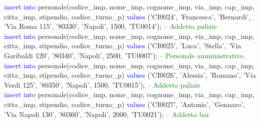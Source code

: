 \documentclass{article}
\begin{document}
\begin{flushleft}
{        \vspace{2mm}
        \hspace*{0.5em}\textcolor{blue}{insert into} personale(codice\_imp, nome\_imp, cognome\_imp, via\_imp, cap\_imp, \hspace*{0.5em}citta\_imp, stipendio, codice\_turno\_p) \textcolor{blue}{values} ('CI0024', 'Francesca', 'Bernardi', \hspace*{0.5em}'Via Roma 115', \hspace*{0.5em}'80330', 'Napoli', 1500, 'TU0014'); \hspace*{0.5em} \textcolor{green}{-- Addetto pulizie} \\
        \vspace{2mm}
        \hspace*{0.5em}\textcolor{blue}{insert into} personale(codice\_imp, nome\_imp, cognome\_imp, via\_imp, cap\_imp, \hspace*{0.5em}citta\_imp, stipendio, codice\_turno\_p) \textcolor{blue}{values} ('CI0025', 'Luca', 'Stella', 'Via \hspace*{0.5em}Garibaldi 120', \hspace*{0.5em}'80340', 'Napoli', 2500, 'TU0007'); \hspace*{0.5em} \textcolor{green}{-- Personale \hspace*{0.5em}amministrativo} \\
        \vspace{2mm}
        \hspace*{0.5em}\textcolor{blue}{insert into} personale(codice\_imp, nome\_imp, cognome\_imp, via\_imp, cap\_imp, \hspace*{0.5em}citta\_imp, stipendio, codice\_turno\_p) \textcolor{blue}{values} ('CI0026', 'Alessia', 'Romano', 'Via \hspace*{0.5em}Verdi 125', \hspace*{0.5em}'80350', 'Napoli', 1500, 'TU0015'); \hspace*{0.5em} \textcolor{green}{-- Addetto pulizie} \\
        \vspace{2mm}
        \hspace*{0.5em}\textcolor{blue}{insert into} personale(codice\_imp, nome\_imp, cognome\_imp, via\_imp, cap\_imp, \hspace*{0.5em}citta\_imp, stipendio, codice\_turno\_p) \textcolor{blue}{values} ('CI0027', 'Antonio', 'Gennaro', \hspace*{0.5em}'Via Napoli 130', \hspace*{0.5em}'80360', 'Napoli', 2000, 'TU0021'); \hspace*{0.5em} \textcolor{green}{-- Addetto bar} \\
}
\end{flushleft}
\end{document}
